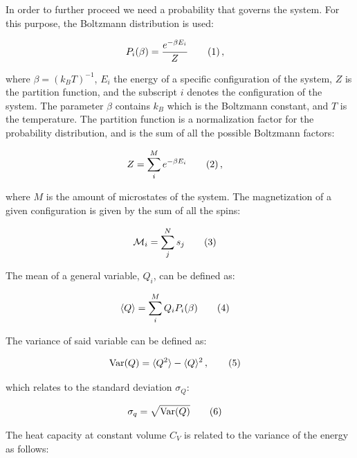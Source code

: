 \documentclass[reprint,english,notitlepage]{revtex4-1}  %
\newcommand\numberthis{\addtocounter{equation}{1}\tag{\theequation}}
\begin{document}
In order to further proceed we need a probability that governs the system. For this purpose, the Boltzmann distribution is used:

\begin{align*}
P_i (\beta) &= \frac{e^{-\beta E_i}}{Z} \numberthis \label{eq:boltzmann_dist} \, ,
\end{align*}

where $\beta = (k_B T)^{-1}$, $E_i$ the energy of a specific configuration of the system, $Z$ is the partition function, and the subscript $i$ denotes the configuration of the system. The parameter $\beta$ contains $k_B$ which is the Boltzmann constant, and $T$ is the temperature. The partition function is a normalization factor for the probability distribution, and is the sum of all the possible Boltzmann factors:

\begin{align*}
Z &= \sum\limits_i^M e^{-\beta E_i} \numberthis \label{eq:ising_partition_function} \, ,
\end{align*}  

where $M$ is the amount of microstates of the system. The magnetization of a given configuration is given by the sum of all the spins:

\begin{align*}
\mathcal{M}_i &= \sum\limits_j^N s_j \numberthis \label{eq:ising_magnetization}
\end{align*}

The mean of a general variable, $Q_i$, can be defined as:

\begin{align*}
\langle Q \rangle &= \sum\limits_i^M Q_i P_i(\beta) \numberthis \label{eq:mean}
\end{align*}

The variance of said variable can be defined as:

\begin{align*}
\text{Var}(Q) &= \langle Q^2 \rangle - \langle Q \rangle^2 \, , \numberthis \label{eq:variance} 
\end{align*}

which relates to the standard deviation $\sigma_Q$:

\begin{align*}
\sigma_q &= \sqrt{\text{Var}(Q)} \numberthis \label{eq:standard_deviation}
\end{align*}

The heat capacity at constant volume $C_V$ is related to the variance of the energy as follows:
\end{document}
